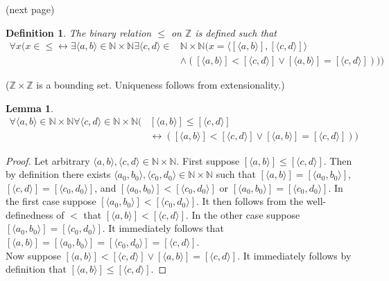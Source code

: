 \documentclass{report}
\newtheorem{lemma}[theo]{Lemma}
\newtheorem{definition}[theo]{Definition}
\begin{document}
\noindent(next page)\newpage
\begin{definition}
The binary relation $\leq$ on $\mathbb Z$ is defined such that
\begin{align*}
\forall x(x\in\leq\leftrightarrow\exists\langle a,b\rangle\in\mathbb N\times\mathbb N\exists\langle c,d\rangle\in&\mathbb N\times\mathbb N(x=\langle[\langle a,b\rangle],[\langle c,d\rangle]\rangle\\
&\land([\langle a,b\rangle]<[\langle c,d\rangle]\lor[\langle a,b\rangle]=[\langle c,d\rangle])))
\end{align*}
\end{definition}
\noindent($\mathbb Z\times\mathbb Z$ is a bounding set. Uniqueness follows from extensionality.)
\begin{lemma}\label{Z_order_3}
\begin{align*}
\forall\langle a,b\rangle\in\mathbb N\times\mathbb N\forall\langle c,d\rangle\in\mathbb N\times\mathbb N(&[\langle a,b\rangle]\leq[\langle c,d\rangle]\\&\leftrightarrow
([\langle a,b\rangle]<[\langle c,d\rangle]\lor[\langle a,b\rangle]=[\langle c,d\rangle]))
\end{align*}
\end{lemma}
\begin{proof}
Let arbitrary $\langle a,b\rangle,\langle c,d\rangle\in\mathbb N\times\mathbb N$. First suppose 
$[\langle a,b\rangle]\leq[\langle c,d\rangle]$. Then by definition there exists
$\langle a_0,b_0\rangle,\langle c_0,d_0\rangle\in\mathbb N\times\mathbb N$ such that 
$[\langle a,b\rangle]=[\langle a_0,b_0\rangle]$, $[\langle c,d\rangle]=[\langle c_0,d_0\rangle]$,
and $[\langle a_0,b_0\rangle]<[\langle c_0,d_0\rangle]$ or $[\langle a_0,b_0\rangle]=[\langle c_0,d_0\rangle]$. In the first case suppose $[\langle a_0,b_0\rangle]<[\langle c_0,d_0\rangle]$. It 
then follows from the well-definedness of $<$ that $[\langle a,b\rangle]<[\langle c,d\rangle]$. In the other case suppose 
$[\langle a_0,b_0\rangle]=[\langle c_0,d_0\rangle]$. It immediately follows that $[\langle a,b\rangle]=[\langle a_0,b_0\rangle]=[\langle c_0,d_0\rangle]=[\langle c,d\rangle]$.\\
\indent Now suppose $[\langle a,b\rangle]<[\langle c,d\rangle]\lor[\langle a,b\rangle]=[\langle c,d\rangle]$. It immediately follows by definition that $[\langle a,b\rangle]\leq[\langle c,d\rangle]$.
\end{proof}
\end{document}
